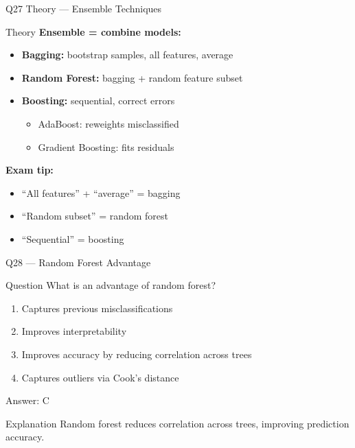 \documentclass[aspectratio=169,8pt]{beamer}
\begin{document}
	\begin{frame}{Q27 Theory --- Ensemble Techniques}
		\begin{block}{Theory}
			\textbf{Ensemble = combine models:}
			\begin{itemize}
				\item \textbf{Bagging:} bootstrap samples, all features, average
				\item \textbf{Random Forest:} bagging + random feature subset
				\item \textbf{Boosting:} sequential, correct errors
				\begin{itemize}
					\item AdaBoost: reweights misclassified
					\item Gradient Boosting: fits residuals
				\end{itemize}
			\end{itemize}
			\textbf{Exam tip:}
			\begin{itemize}
				\item ``All features'' + ``average'' = bagging
				\item ``Random subset'' = random forest
				\item ``Sequential'' = boosting
			\end{itemize}
		\end{block}
	\end{frame}
	
	\begin{frame}{Q28 --- Random Forest Advantage}
		\begin{block}{Question}
			What is an advantage of random forest?
		\end{block}
		\begin{enumerate}[label=\Alph*.]
			\item Captures previous misclassifications
			\item Improves interpretability
			\item Improves accuracy by reducing correlation across trees
			\item Captures outliers via Cook's distance
		\end{enumerate}
		\begin{exampleblock}{Answer: C}
		\end{exampleblock}
		\begin{block}{Explanation}
			Random forest reduces correlation across trees, improving prediction accuracy.
		\end{block}
	\end{frame}
	
\end{document}
